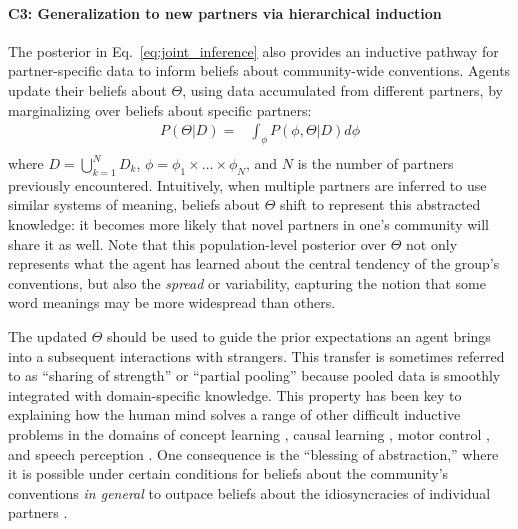 \paragraph{C3: Generalization to new partners via hierarchical induction}

The posterior in Eq.~\ref{eq:joint_inference} also provides an inductive pathway for partner-specific data to inform beliefs about community-wide conventions.
Agents update their beliefs about $\Theta$, using data accumulated from different partners, by marginalizing over beliefs about specific partners:
\begin{equation}
\begin{split}
    P(\Theta | D)  = & \int_{\phi} P(\phi, \Theta | D) d\phi \\
\end{split}
\end{equation}
where $D = \bigcup_{k=1}^N D_k$, $\phi = \phi_1 \times \dots \times \phi_N$, and $N$ is the number of partners previously encountered. 
Intuitively, when multiple partners are inferred to use similar systems of meaning, beliefs about $\Theta$ shift to represent this abstracted knowledge: it becomes more likely that novel partners in one's community will share it as well.
Note that this population-level posterior over $\Theta$ not only represents what the agent has learned about the central tendency of the group's conventions, but also the \emph{spread} or variability, capturing the notion that some word meanings may be more widespread than others.

The updated $\Theta$ should be used to guide the prior expectations an agent brings into a subsequent interactions with strangers.
This transfer is sometimes referred to as ``sharing of strength'' or ``partial pooling'' because pooled data is smoothly integrated with domain-specific knowledge.
This property has been key to explaining how the human mind solves a range of other difficult inductive problems in the domains of concept learning \cite{KempPerforsTenenbaum07_HBM, tenenbaum_how_2011}, causal learning \cite{KempPerforsTenenbaum07_HBM,KempGoodmanTenenbaum10_LearningToLearn},  motor control \cite{berniker2008estimating}, and speech perception \cite{kleinschmidt2015robust}.
One consequence is the ``blessing of abstraction,'' \cite{GoodmanUllmanTenenbaum11_TheoryOfCausality} where it is possible under certain conditions for beliefs about the community's conventions \emph{in general} to outpace beliefs about the idiosyncracies of individual partners \cite{gershman2017blessing}.

